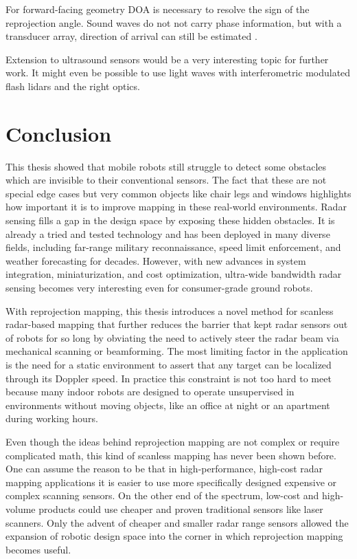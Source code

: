 For forward-facing geometry DOA is necessary to resolve the sign of the
reprojection angle. Sound waves do not not carry phase information, but
with a transducer array, direction of arrival can still be estimated
\cite{Kunin2010}.

Extension to ultrasound sensors would be a very interesting topic for
further work. It might even be possible to use light waves with interferometric
modulated flash lidars and the right optics.


\section{Conclusion}\label{conclusion-1}
This thesis showed that mobile robots still struggle to detect some obstacles which are invisible to their conventional sensors. The fact that these are not special edge cases but very common objects like chair legs and windows highlights how important it is to improve mapping in these real-world environments. Radar sensing fills a gap in the design space by exposing these hidden obstacles. It is already a tried and tested technology and has been deployed in many diverse fields, including far-range military reconnaissance, speed limit enforcement, and weather forecasting for decades. However, with new advances in system integration, miniaturization, and cost optimization, ultra-wide bandwidth radar sensing becomes very interesting even for consumer-grade ground robots.

With reprojection mapping, this thesis introduces a novel method for scanless radar-based mapping that further reduces the barrier that kept radar sensors out of robots for so long by obviating the need to actively steer the radar beam via mechanical scanning or beamforming. The most limiting factor in the application is the need for a static environment to assert that any target can be localized through its Doppler speed. In practice this constraint is not too hard to meet because many indoor robots are designed to operate unsupervised in environments without moving objects, like an office at night or an apartment during working hours.

Even though the ideas behind reprojection mapping are not complex or require complicated math, this kind of scanless mapping has never been shown before. One can assume the reason to be that in high-performance, high-cost radar mapping applications it is easier to use more specifically designed expensive or complex scanning sensors. On the other end of the spectrum, low-cost and high-volume products could use cheaper and proven traditional sensors like laser scanners. Only the advent of cheaper and smaller radar range sensors allowed the expansion of robotic design space into the corner in which reprojection mapping becomes useful.

